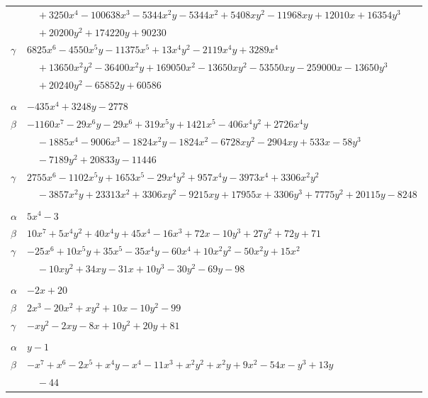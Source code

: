 \documentclass[11pt]{article}
\begin{document}
\begin{longtable}{@{}ll@{}}
 & $\quad +3250x^{4}-100638x^{3}-5344x^{2}y-5344x^{2}+5408xy^{2}-11968xy+12010x+16354y^{3}$\\
 & $\quad +20200y^{2}+174220y+90230$\\
$\gamma$ & $6825x^{6}-4550x^{5}y-11375x^{5}+13x^{4}y^{2}-2119x^{4}y+3289x^{4}$\\
 & $\quad +13650x^{2}y^{2}-36400x^{2}y+169050x^{2}-13650xy^{2}-53550xy-259000x-13650y^{3}$\\
 & $\quad +20240y^{2}-65852y+60586$\\
\addlinespace[3pt]
\multicolumn{2}{@{}l}{$\{i,j\}=\{11,22\}$, $k_{ij}=2^{2}\cdot 3\cdot 5\cdot 7$}\\
$\alpha$ & $-435x^{4}+3248y-2778$\\
$\beta$ & $-1160x^{7}-29x^{6}y-29x^{6}+319x^{5}y+1421x^{5}-406x^{4}y^{2}+2726x^{4}y$\\
 & $\quad -1885x^{4}-9006x^{3}-1824x^{2}y-1824x^{2}-6728xy^{2}-2904xy+533x-58y^{3}$\\
 & $\quad -7189y^{2}+20833y-11446$\\
$\gamma$ & $2755x^{6}-1102x^{5}y+1653x^{5}-29x^{4}y^{2}+957x^{4}y-3973x^{4}+3306x^{2}y^{2}$\\
 & $\quad -3857x^{2}y+23313x^{2}+3306xy^{2}-9215xy+17955x+3306y^{3}+7775y^{2}+20115y-8248$\\
\addlinespace[3pt]
\multicolumn{2}{@{}l}{$\{i,j\}=\{11,23\}$, $k_{ij}=2^{3}\cdot 3$}\\
$\alpha$ & $5x^{4}-3$\\
$\beta$ & $10x^{7}+5x^{4}y^{2}+40x^{4}y+45x^{4}-16x^{3}+72x-10y^{3}+27y^{2}+72y+71$\\
$\gamma$ & $-25x^{6}+10x^{5}y+35x^{5}-35x^{4}y-60x^{4}+10x^{2}y^{2}-50x^{2}y+15x^{2}$\\
 & $\quad -10xy^{2}+34xy-31x+10y^{3}-30y^{2}-69y-98$\\
\addlinespace[3pt]
\multicolumn{2}{@{}l}{$\{i,j\}=\{12,13\}$, $k_{ij}=2^{3}\cdot 5^{2}$}\\
$\alpha$ & $-2x+20$\\
$\beta$ & $2x^{3}-20x^{2}+xy^{2}+10x-10y^{2}-99$\\
$\gamma$ & $-xy^{2}-2xy-8x+10y^{2}+20y+81$\\
\addlinespace[3pt]
\multicolumn{2}{@{}l}{$\{i,j\}=\{12,16\}$, $k_{ij}=2^{7}$}\\
$\alpha$ & $y-1$\\
$\beta$ & $-x^{7}+x^{6}-2x^{5}+x^{4}y-x^{4}-11x^{3}+x^{2}y^{2}+x^{2}y+9x^{2}-54x-y^{3}+13y$\\
 & $\quad -44$\\

\end{longtable}
\end{document}
